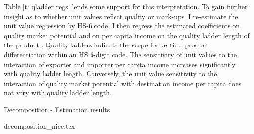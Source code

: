 \documentclass[12pt,a4paper,oneside,times]{article}   	%
\newcommand{\tablespath}{{"C:/Users/dhill/Dropbox/Dissertation"}}
\begin{document}
Table \ref{t: qladder regs} lends some support for this interpretation. To gain further insight as to whether unit values reflect quality or mark-ups, I re-estimate the unit value regression by HS-6 code. I then regress the estimated coefficients on quality market potential and on per capita income on the quality ladder length of the product \citep{Khandelwal2010}. Quality ladders indicate the scope for vertical product differentiation within an HS 6-digit code. The sensitivity of unit values to the interaction of exporter and importer per capita income increases significantly with quality ladder length. Conversely, the unit value sensitivity to the interaction of quality market potential with destination income per capita does not vary with quality ladder length.


\begin{table}[htbp]\centering
\caption{Decomposition - Estimation results \label{t: decomp}}
{decomposition_nice.tex}
\end{table}

%
%
\end{document}
